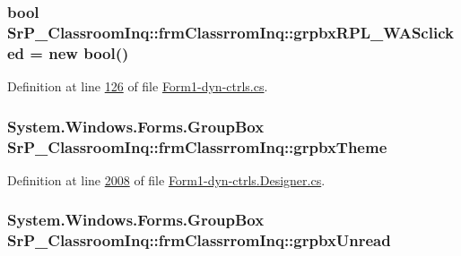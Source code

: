 \hypertarget{class_sr_p___classroom_inq_1_1frm_classrrom_inq_a97ab9f8512cd6b2f9648651d5c5d404b}{
\subsubsection[{grpbx\-R\-P\-L\-\_\-\-W\-A\-Sclicked}]{\setlength{\rightskip}{0pt plus 5cm}bool {\bf \-Sr\-P\-\_\-\-Classroom\-Inq\-::frm\-Classrrom\-Inq\-::grpbx\-R\-P\-L\-\_\-\-W\-A\-Sclicked} = new bool()}}
\label{class_sr_p___classroom_inq_1_1frm_classrrom_inq_a97ab9f8512cd6b2f9648651d5c5d404b}


\-Definition at line \hyperlink{_form1-dyn-ctrls_8cs_source_l00126}{126} of file \hyperlink{_form1-dyn-ctrls_8cs_source}{\-Form1-\/dyn-\/ctrls.\-cs}.

\hypertarget{class_sr_p___classroom_inq_1_1frm_classrrom_inq_a8973e652358c775fec622ec378a52bf9}{
\subsubsection[{grpbx\-Theme}]{\setlength{\rightskip}{0pt plus 5cm}\-System.\-Windows.\-Forms.\-Group\-Box {\bf \-Sr\-P\-\_\-\-Classroom\-Inq\-::frm\-Classrrom\-Inq\-::grpbx\-Theme}}}
\label{class_sr_p___classroom_inq_1_1frm_classrrom_inq_a8973e652358c775fec622ec378a52bf9}


\-Definition at line \hyperlink{_form1-dyn-ctrls_8_designer_8cs_source_l02008}{2008} of file \hyperlink{_form1-dyn-ctrls_8_designer_8cs_source}{\-Form1-\/dyn-\/ctrls.\-Designer.\-cs}.

\hypertarget{class_sr_p___classroom_inq_1_1frm_classrrom_inq_a0e65b517d6f3d5bc8e159ff6283dc508}{
\subsubsection[{grpbx\-Unread}]{\setlength{\rightskip}{0pt plus 5cm}\-System.\-Windows.\-Forms.\-Group\-Box {\bf \-Sr\-P\-\_\-\-Classroom\-Inq\-::frm\-Classrrom\-Inq\-::grpbx\-Unread}}}
\label{class_sr_p___classroom_inq_1_1frm_classrrom_inq_a0e65b517d6f3d5bc8e159ff6283dc508}


